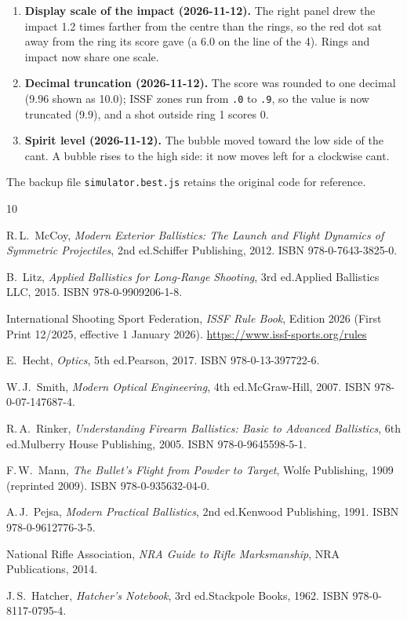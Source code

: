 \documentclass[11pt]{article}
\newcommand{\file}[1]{\texttt{#1}}
\begin{document}
\begin{enumerate}
  \item \textbf{Display scale of the impact (2026-11-12).}
    The right panel drew the impact 1.2 times farther from the centre
    than the rings, so the red dot sat away from the ring its score gave
    (a 6.0 on the line of the 4).  Rings and impact now share one scale.

  \item \textbf{Decimal truncation (2026-11-12).}
    The score was rounded to one decimal (9.96 shown as 10.0); ISSF
    zones run from \texttt{.0} to \texttt{.9}, so the value is now
    truncated (9.9), and a shot outside ring 1 scores 0.

  \item \textbf{Spirit level (2026-11-12).}
    The bubble moved toward the low side of the cant.  A bubble rises
    to the high side: it now moves left for a clockwise cant.
\end{enumerate}

The backup file \file{simulator.best.js} retains the original code
for reference.

\begin{thebibliography}{10}

  R.\,L.~McCoy,
  \textit{Modern Exterior Ballistics: The Launch and Flight Dynamics
  of Symmetric Projectiles},
  2nd ed.\@ Schiffer Publishing, 2012.
  ISBN 978-0-7643-3825-0.

  B.~Litz,
  \textit{Applied Ballistics for Long-Range Shooting},
  3rd ed.\@ Applied Ballistics LLC, 2015.
  ISBN 978-0-9909206-1-8.

  International Shooting Sport Federation,
  \textit{ISSF Rule Book}, Edition 2026
  (First Print 12/2025, effective 1 January 2026).
  \url{https://www.issf-sports.org/rules}

  E.~Hecht,
  \textit{Optics},
  5th ed.\@ Pearson, 2017.
  ISBN 978-0-13-397722-6.

  W.\,J.~Smith,
  \textit{Modern Optical Engineering},
  4th ed.\@ McGraw-Hill, 2007.
  ISBN 978-0-07-147687-4.

  R.\,A.~Rinker,
  \textit{Understanding Firearm Ballistics: Basic to Advanced
  Ballistics},
  6th ed.\@ Mulberry House Publishing, 2005.
  ISBN 978-0-9645598-5-1.

  F.\,W.~Mann,
  \textit{The Bullet's Flight from Powder to Target},
  Wolfe Publishing, 1909 (reprinted 2009).
  ISBN 978-0-935632-04-0.

  A.\,J.~Pejsa,
  \textit{Modern Practical Ballistics},
  2nd ed.\@ Kenwood Publishing, 1991.
  ISBN 978-0-9612776-3-5.

  National Rifle Association,
  \textit{NRA Guide to Rifle Marksmanship},
  NRA Publications, 2014.

  J.\,S.~Hatcher,
  \textit{Hatcher's Notebook},
  3rd ed.\@ Stackpole Books, 1962.
  ISBN 978-0-8117-0795-4.

\end{thebibliography}
\end{document}
